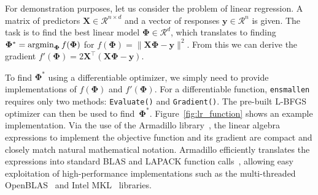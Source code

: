 \documentclass[twoside,11pt]{article}
\begin{document}
For demonstration purposes, let us consider the problem of linear regression.
A matrix of predictors $\bm X \in \mathcal{R}^{n \times d}$
and a vector of responses $\bm y \in \mathcal{R}^n$ is given.
The task is to find the best linear model $\bm \Phi \in \mathcal{R}^d$,
which translates to finding
$\bm \Phi^* = \operatornamewithlimits{argmin}_{\bm\Phi} f(\bm \Phi)$ for
$f(\bm \Phi) = \| \bm X \bm \Phi - \bm y \|^2.$
From this we can derive the gradient
$f'(\bm \Phi) = 2 \bm X^{\top} (\bm X \bm \Phi - \bm y).$


To find $\bm \Phi^*$ using a differentiable optimizer,
we simply need to provide implementations of $f(\bm \Phi)$ and $f'(\bm \Phi)$.
For a differentiable function, {\tt ensmallen} requires only two methods:
{\tt Evaluate()} and {\tt Gradient()}.
The pre-built L-BFGS optimizer can then be used to find~$\bm \Phi^*$.
Figure~\ref{fig:lr_function} shows an example implementation.
Via the use of the Armadillo library~\citep{sanderson2016armadillo},
the linear algebra expressions to implement the objective function and its gradient
are compact and closely match natural mathematical notation.
Armadillo efficiently translates the expressions into standard BLAS and LAPACK function calls~\citep{anderson1999lapack},
allowing easy exploitation of high-performance implementations such as the multi-threaded \mbox{OpenBLAS}~\citep{OpenBLAS} and Intel MKL~\citep{IntelMKL} libraries.




\end{document}
